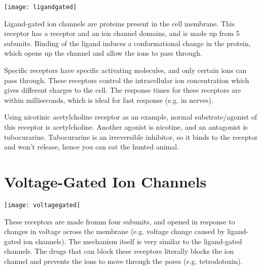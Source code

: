\begin{center}
\texttt{[image: ligandgated]}
\end{center}

Ligand-gated ion channels are proteins present in the cell membrane.
This receptor has a receptor and an ion channel domains, and is made up from 5 subunits.
Binding of the ligand induces a conformational change in the protein, which opens up the channel and allow the ions to pass through.

Specific receptors have specific activating molecules, and only certain ions can pass through.
These receptors control the intracellular ion concentration which gives different charges to the cell.
The response times for these receptors are within milliseconds, which is ideal for fast response (e.g. in nerves).

Using nicotinic acetylcholine receptor as an example, normal substrate/agonist of this receptor is acetylcholine.
Another agonist is nicotine, and an antagonist is tubocurarine.
Tubocurarine is an irreversible inhibitor, so it binds to the receptor and won't release, hence you can eat the hunted animal.

\section{Voltage-Gated Ion Channels}

\begin{center}
\texttt{[image: voltagegated]}
\end{center}

These receptors are made fromm four subunits, and opened in response to changes in voltage across the membrane (e.g. voltage change caused by ligand-gated ion channels).
The mechanism itself is very similar to the ligand-gated channels.
The drugs that can block these receptors literally blocks the ion channel and prevents the ions to move through the pores (e.g. tetrodotoxin).












